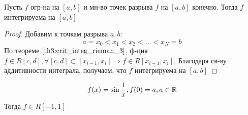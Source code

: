 \begin{consequence}
Пусть $f$ огр-на на $[a, b]$ и мн-во точек разрыва $f$ на $[a, b]$ конечно. Тогда $f$ интегрируема на $[a, b]$
\end{consequence}
\begin{proof}
Добавим к точкам разрыва $a, b$:
\[
a = x_0 < x_1 < x_2 < \ldots < x_N = b
\]
По теореме $\ref{th3:crit_integ_rieman_3}$, ф-ция $f \in R[c, d], \forall [c, d] \subset [x_{i - 1}, x_i] \Rightarrow f \in R[x_{i - 1}, x_i]$. Благодаря св-ву аддитивности интеграла, получаем, что $f$ интегрируема на $[a, b]$
\end{proof}
\begin{example}
\[
f(x) = \sin \frac{1}{x}, f(0) = a, a \in \mathbb{R}
\]
Тогда $f \in R[-1, 1]$
\end{example}

